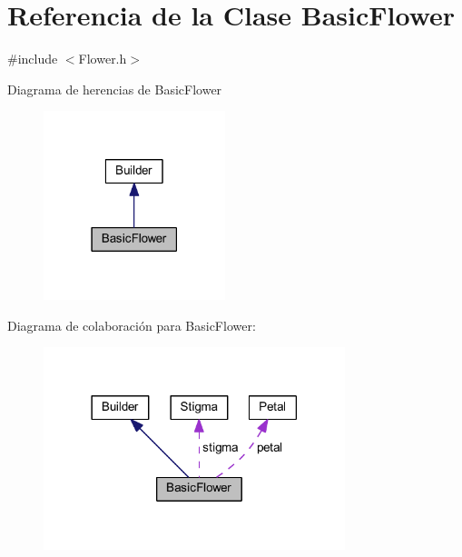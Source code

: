 \hypertarget{class_basic_flower}{}\section{Referencia de la Clase Basic\+Flower}
\label{class_basic_flower}


{\ttfamily \#include $<$Flower.\+h$>$}



Diagrama de herencias de Basic\+Flower
\nopagebreak
\begin{figure}[H]
\begin{center}
\leavevmode
\includegraphics[width=150pt]{class_basic_flower__inherit__graph}
\end{center}
\end{figure}


Diagrama de colaboración para Basic\+Flower\+:
\nopagebreak
\begin{figure}[H]
\begin{center}
\leavevmode
\includegraphics[width=249pt]{class_basic_flower__coll__graph}
\end{center}
\end{figure}
